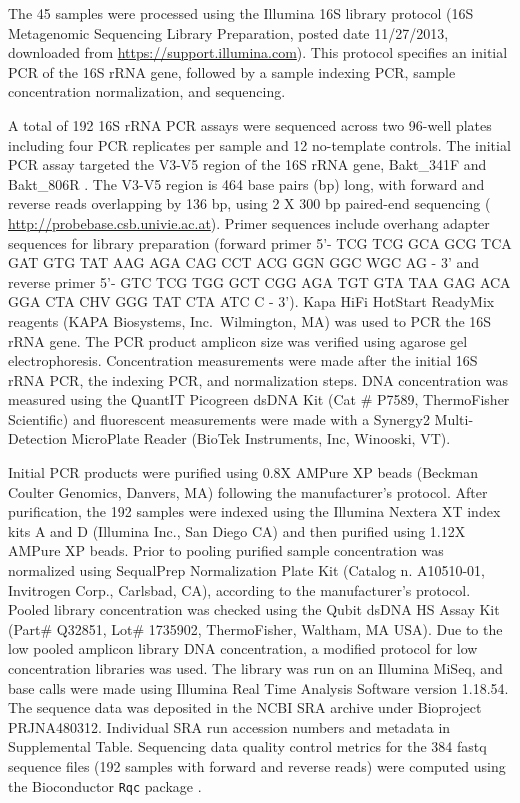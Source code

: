 \documentclass{bmcart}
\begin{document}
The 45 samples were processed using the Illumina 16S library protocol
(16S Metagenomic Sequencing Library Preparation, posted date 11/27/2013,
downloaded from \url{https://support.illumina.com}). This protocol
specifies an initial PCR of the 16S rRNA gene, followed by a sample indexing
PCR, sample concentration normalization, and sequencing.

A total of 192 16S rRNA PCR assays were sequenced across two 96-well plates including four PCR replicates
per sample and 12 no-template controls. The initial
PCR assay targeted the V3-V5 region of the 16S rRNA gene, Bakt\_341F and
Bakt\_806R \cite{klindworth2012evaluation}. The V3-V5 region is 464
base pairs (bp) long, with forward and reverse reads overlapping by 136
bp, using 2 X 300 bp paired-end sequencing \cite{yang2016sensitivity} (
\url{http://probebase.csb.univie.ac.at}). Primer sequences include
overhang adapter sequences for library preparation (forward primer 5'-
TCG TCG GCA GCG TCA GAT GTG TAT AAG AGA CAG CCT ACG GGN GGC WGC AG - 3'
and reverse primer 5'- GTC TCG TGG GCT CGG AGA TGT GTA TAA GAG ACA GGA
CTA CHV GGG TAT CTA ATC C - 3'). Kapa HiFi HotStart
ReadyMix reagents (KAPA Biosystems, Inc.~Wilmington, MA) was used to PCR the 16S rRNA gene. The PCR product amplicon size
was verified using agarose gel electrophoresis.
Concentration measurements were made after the initial 16S rRNA PCR, the
indexing PCR, and normalization steps. DNA concentration was measured
using the QuantIT Picogreen dsDNA Kit (Cat \# P7589, ThermoFisher
Scientific) and fluorescent measurements were made with a Synergy2
Multi-Detection MicroPlate Reader (BioTek Instruments, Inc, Winooski,
VT).


Initial PCR products were purified using 0.8X AMPure XP beads (Beckman
Coulter Genomics, Danvers, MA) following the manufacturer's protocol.
After purification, the 192 samples were indexed using the Illumina
Nextera XT index kits A and D (Illumina Inc., San Diego CA) and then
purified using 1.12X AMPure XP beads. Prior to pooling purified sample
concentration was normalized using SequalPrep Normalization Plate Kit
(Catalog n. A10510-01, Invitrogen Corp., Carlsbad, CA), according to the
manufacturer's protocol. Pooled library concentration was checked using
the Qubit dsDNA HS Assay Kit (Part\# Q32851, Lot\# 1735902,
ThermoFisher, Waltham, MA USA). Due to the low pooled amplicon library
DNA concentration, a modified protocol for low concentration libraries
was used. The library was run on an Illumina MiSeq, and base calls were
made using Illumina Real Time Analysis Software version 1.18.54.
The sequence data was deposited in the NCBI SRA archive under Bioproject
PRJNA480312. Individual SRA run accession numbers and metadata in Supplemental Table.
Sequencing data quality control metrics for the 384 fastq sequence files
(192 samples with forward and reverse reads) were computed using the
Bioconductor \texttt{Rqc} package \cite{Rqc, Bioconductor}.
\end{document}
